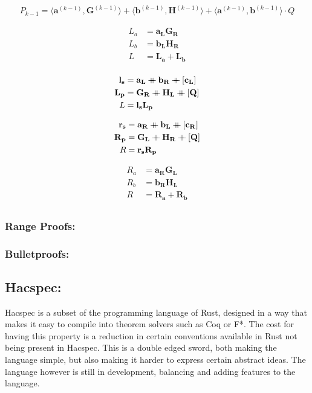 \documentclass{article}
\newcommand{\eq}[1]{\begin{equation*}\begin{split}#1\end{split}\end{equation*}}
\renewcommand{\vec}[1]{\mathbf{#1}}
\newcommand\doubleplus{\mathbin{+\mkern-10mu+}} %
\newcommand{\dotp}[2]{\langle #1, #2 \rangle}
\begin{document}
\eq{
	P_{k-1} = \dotp{\vec{a}^{(k-1)}}{\vec{G}^{(k-1)}} + \dotp{\vec{b}^{(k-1)}}{\vec{H}^{(k-1)}} + \dotp{\vec{a}^{(k-1)}}{\vec{b}^{(k-1)}} \cdot Q
}

\eq{
	L_a &= \vec{a_L G_R} \\
	L_b &= \vec{b_L H_R} \\
	L   &= \vec{L_a + L_b} \\
}

\eq{
	\vec{l_{s}} &= \vec{a_L \doubleplus b_R \doubleplus [c_L]} \\
	\vec{L_{p}} &= \vec{G_R \doubleplus H_L \doubleplus [Q] } \\
	L   &= \vec{l_s L_p} \\
}

\eq{
	\vec{r_{s}} &= \vec{a_R \doubleplus b_L \doubleplus [c_R]} \\
	\vec{R_{p}} &= \vec{G_L \doubleplus H_R \doubleplus [Q] } \\
	R   &= \vec{r_s R_p} \\
}

\eq{
	R_a &= \vec{a_R G_L} \\
	R_b &= \vec{b_R H_L} \\
	R   &= \vec{R_a + R_b} \\
}

\subsubsection{Range Proofs:}

\subsubsection{Bulletproofs:}


\subsection{Hacspec:} \label{Hacspec}

Hacspec is a subset of the programming language of Rust, designed in a
way that makes it easy to compile into theorem solvers such as Coq or F*.
The cost for having this property is a reduction in certain conventions
available in Rust not being present in Hacspec. This is a double edged
sword, both making the language simple, but also making it harder to
express certain abstract ideas. The language however is still in
development, balancing and adding features to the language.
\end{document}
